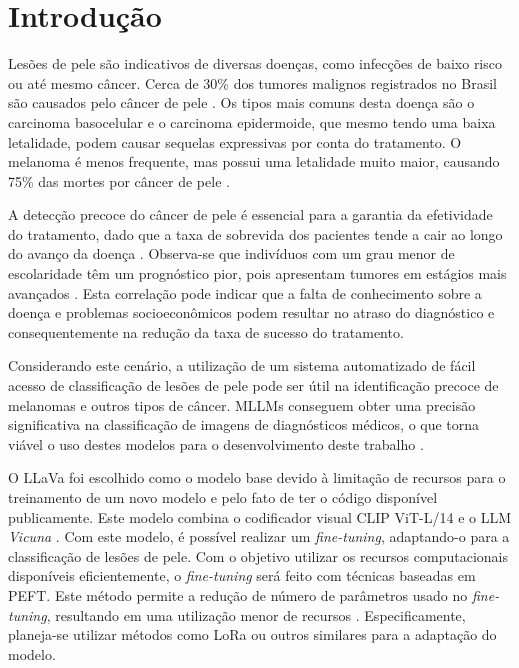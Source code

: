 \chapter{Introdução}

Lesões de pele são indicativos de diversas doenças, como infecções de baixo risco ou até mesmo câncer. Cerca de 30\% dos tumores malignos registrados no Brasil são
causados pelo câncer de pele \cite{skin_cancer_in_brazil}. Os tipos mais comuns desta doença são o carcinoma basocelular e o carcinoma epidermoide, que mesmo tendo uma
baixa letalidade, podem causar sequelas expressivas por conta do tratamento. O melanoma é menos frequente, mas possui uma letalidade muito maior, causando 75\% das mortes
por câncer de pele \cite{skin_cancer_screening}.

A detecção precoce do câncer de pele é essencial para a garantia da efetividade do tratamento, dado que a taxa de sobrevida dos pacientes tende a cair ao longo do avanço
da doença \cite{skin_cancer_survival}. Observa-se que indivíduos com um grau menor de escolaridade têm um prognóstico pior, pois apresentam tumores em estágios mais
avançados \cite{skin_cancer_socioeconomic}. Esta correlação pode indicar que a falta de conhecimento sobre a doença e problemas socioeconômicos podem resultar no atraso
do diagnóstico e consequentemente na redução da taxa de sucesso do tratamento.

Considerando este cenário, a utilização de um sistema automatizado de fácil acesso de classificação de lesões de pele pode ser útil na identificação precoce de melanomas
e outros tipos de câncer. \ac{MLLMs} conseguem obter uma precisão significativa na classificação de imagens de diagnósticos médicos, o que torna viável o uso destes modelos
para o desenvolvimento deste trabalho \cite{mllm_success_rate}.

O \ac{LLaVa} foi escolhido como o modelo base devido à limitação de recursos para o treinamento de um novo modelo e pelo fato de ter o código disponível publicamente. Este
modelo combina o codificador visual \ac{CLIP ViT-L/14} e o \ac{LLM} \textit{Vicuna} \cite{llava}. Com este modelo, é possível realizar um \textit{fine-tuning}, adaptando-o
para a classificação de lesões de pele. Com o objetivo utilizar os recursos computacionais disponíveis eficientemente, o \textit{fine-tuning} será feito com técnicas
baseadas em \ac{PEFT}. Este método permite a redução de número de parâmetros usado no \textit{fine-tuning}, resultando em uma utilização menor de recursos \cite{peft}.
Especificamente, planeja-se utilizar métodos como \ac{LoRa} ou outros similares para a adaptação do modelo.

